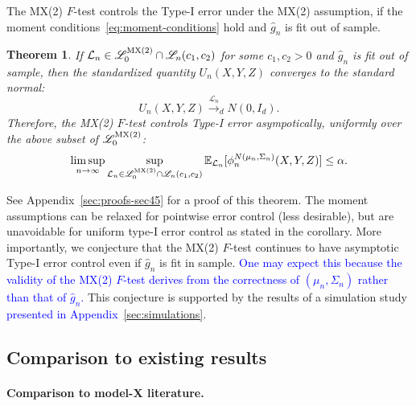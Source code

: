 \documentclass[ejs]{imsart}
\numberwithin{equation}{section}
\theoremstyle{plain}
\newtheorem{theorem}{Theorem}[section]
\theoremstyle{definition}
\theoremstyle{remark}
\newcommand{\srx}{X}
\newcommand{\srz}{Z}
\newcommand{\sry}{Y}
\begin{document}
The MX(2) $F$-test controls the Type-I error under the MX(2) assumption, if the moment conditions~\eqref{eq:moment-conditions} hold and $\widehat g_n$ is fit out of sample.
\begin{theorem} \label{thm:asymptotic-alpha-level}
If $\mathcal L_n \in \mathscr L_0^{\textnormal{MX(2)}}\cap \mathscr L_n(c_1, c_2)$ for some $c_1, c_2 > 0$ and $\widehat g_n$ is fit out of sample, then the standardized quantity $U_n(\srx, \sry, \srz)$ converges to the standard normal: 
\begin{equation}
	U_n(\srx, \sry, \srz) \overset{\mathcal L_n}\rightarrow_d N(0, I_d).
	\label{eq:asymptotic-normality}
\end{equation}
Therefore, the MX(2) $F$-test controls Type-I error asympotically, uniformly over the above subset of $\mathscr L_0^{\textnormal{MX(2)}}$: 
\begin{equation}
	\limsup_{n \rightarrow \infty} \sup_{\mathcal L_n \in \mathscr L_0^{\textnormal{MX(2)}}\cap \mathscr L_n(c_1, c_2)} \mathbb E_{\mathcal L_n}[\phi^{N(\mu_n, \Sigma_n)}_n(\srx, \sry, \srz)] \leq \alpha.
	\label{asymptotic-alpha-level}
\end{equation}
\end{theorem}

See Appendix~\ref{sec:proofs-sec45} for a proof of this theorem. The moment assumptions can be relaxed for pointwise error control (less desirable), but are unavoidable for uniform type-I error control as stated in the corollary. More importantly, we conjecture that the MX(2) $F$-test continues to have asymptotic Type-I error control even if $\widehat g_n$ is fit in sample. \textcolor{blue}{One may expect this because the validity of the MX(2) $F$-test derives from the correctness of $(\mu_n, \Sigma_n)$ rather than that of $\widehat g_n$.} This conjecture is supported by the results of a simulation study \textcolor{blue}{presented in Appendix~\ref{sec:simulations}}.

\subsection{Comparison to existing results} \label{sec:comparison-to-existing-results-3}

\paragraph{Comparison to model-X literature.}
\end{document}

